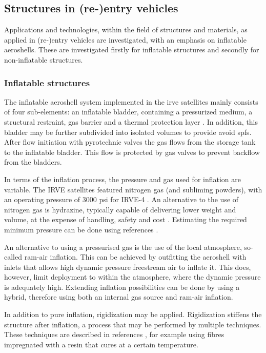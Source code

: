 \subsection{Structures in (re-)entry vehicles}\label{sec:struc}
Applications and technologies, within the field of structures and materials, as applied in (re-)entry vehicles are investigated, with an emphasis on inflatable aeroshells. These are investigated firstly for inflatable structures and secondly for non-inflatable structures.

\subsubsection{Inflatable structures}
The inflatable aeroshell system implemented in the \gls{irve} satellites mainly consists of four sub-elements: an inflatable bladder, containing a pressurized medium, a structural restraint, gas barrier and a thermal protection layer \cite{Hughes2005}. In addition, this bladder may be further subdivided into isolated volumes to provide avoid \gls{spfs}. After flow initiation with pyrotechnic valves the gas flows from the storage tank to the inflatable bladder. This flow is protected by gas valves to prevent backflow from the bladders. \cite{Hughes2005} 

In terms of the inflation process, the pressure and gas used for inflation are variable. The IRVE satellites featured nitrogen gas (and subliming powders), with an operating pressure of 3000 psi for IRVE-4 \cite{Litton2011}. An alternative to the use of nitrogen gas is hydrazine, typically capable of delivering lower weight and volume, at the expense of handling, safety and cost \cite{Freeland1998}. Estimating the required minimum pressure can be done using references \cite{Samareh2011, Brown2009}.

An alternative to using a pressurised gas is the use of the local atmosphere, so-called ram-air inflation. This can be achieved by outfitting the aeroshell with inlets that allows high dynamic pressure freestream air to inflate it. This does, however, limit deployment to within the atmosphere, where the dynamic pressure is adequately high. Extending inflation possibilities can be done by using a hybrid, therefore using both an internal gas source and ram-air inflation. \cite{Smith2010}

In addition to pure inflation, rigidization may be applied. Rigidization stiffens the structure after inflation, a process that may be performed by multiple techniques. These techniques are described in references \cite{Freeland1998,Jenkins2001}, for example using fibres impregnated with a resin that cures at a certain temperature. 

